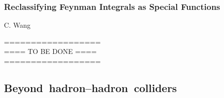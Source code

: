 \documentclass{FBR_Bericht_2025}
\begin{document}
\begin{refsection}
\subsubsection{Reclassifying Feynman Integrals as Special Functions}
\begin{Namen}
C. Wang
\end{Namen}
%
{\color{red} ==================\\ ====\; TO BE DONE\; ====\\ ==================}
%
\printbibliography[heading=subbibliography]
\end{refsection}

\subsection{\mbox{Beyond hadron--hadron colliders}}
\end{document}
